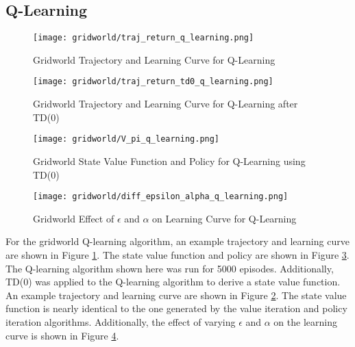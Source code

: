 \subsection*{Q-Learning}
\begin{figure}[ht]
\centering
\texttt{[image: gridworld/traj\_return\_q\_learning.png]}
\caption{Gridworld Trajectory and Learning Curve for Q-Learning}
\label{fig:gridworld_traj_return_q_learning}
\end{figure}

\begin{figure}[ht]
\centering
\texttt{[image: gridworld/traj\_return\_td0\_q\_learning.png]}
\caption{Gridworld Trajectory and Learning Curve for Q-Learning after TD(0)}
\label{fig:gridworld_traj_return_td0_q_learning}
\end{figure}

\begin{figure}[ht]
\centering
\texttt{[image: gridworld/V\_pi\_q\_learning.png]}
\caption{Gridworld State Value Function and Policy for Q-Learning using TD(0)}
\label{fig:gridworld_V_pi_q_learning}
\end{figure}

\begin{figure}
\centering
\texttt{[image: gridworld/diff\_epsilon\_alpha\_q\_learning.png]}
\caption{Gridworld Effect of $\epsilon$ and $\alpha$ on Learning Curve for Q-Learning}
\label{fig:gridworld_diff_epsilon_alpha_q_learning}
\end{figure}

For the gridworld Q-learning algorithm, an example trajectory and learning curve are shown in Figure \ref{fig:gridworld_traj_return_q_learning}. The state value function and policy are shown in Figure \ref{fig:gridworld_V_pi_q_learning}. The Q-learning algorithm shown here was run for 5000 episodes. Additionally, TD(0) was applied to the Q-learning algorithm to derive a state value function. An example trajectory and learning curve are shown in Figure \ref{fig:gridworld_traj_return_td0_q_learning}. The state value function is nearly identical to the one generated by the value iteration and policy iteration algorithms. Additionally, the effect of varying $\epsilon$ and $\alpha$ on the learning curve is shown in Figure \ref{fig:gridworld_diff_epsilon_alpha_q_learning}.

\FloatBarrier